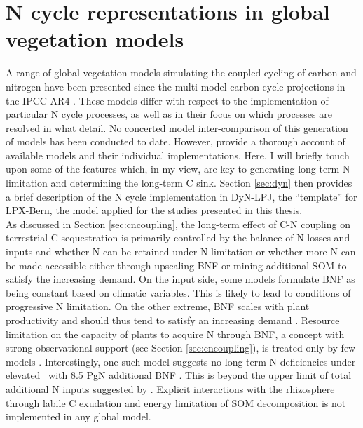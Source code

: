 \section{N cycle representations in global vegetation models}
\label{sec:nmodels}
A range of global vegetation models simulating the coupled cycling of carbon and nitrogen have been presented since the multi-model carbon cycle projections in the IPCC AR4 \citep{denman07ipcc}. These models differ with respect to the implementation of particular N cycle processes, as well as in their focus on which processes are resolved in what detail. No concerted model inter-comparison of this generation of models has been conducted to date. However, \citep{zaehledalmonech11} provide a thorough account of available models and their individual implementations. Here, I will briefly touch upon some of the features which, in my view, are key to generating long term N limitation and determining the long-term C sink. Section \ref{sec:dyn} then provides a brief description of the N cycle implementation in DyN-LPJ, the ``template'' for LPX-Bern, the model applied for the studies presented in this thesis.\\

As discussed in Section \ref{sec:cncoupling}, the long-term effect of C-N coupling on terrestrial C sequestration is primarily controlled by the balance of N losses and inputs and whether N can be retained under N limitation or whether more N can be made accessible either through upscaling BNF or mining additional SOM to satisfy the increasing demand. On the input side, some models \citep{zaehle10ocn1, jain09} formulate BNF as being constant based on climatic variables. This is likely to lead to conditions of progressive N limitation. On the other extreme, BNF scales with plant productivity and should thus tend to satisfy an increasing demand \citep{xuri08gcb, thornton07}. Resource limitation on the capacity of plants to acquire N through BNF, a concept with strong observational support (see Section \ref{sec:cncoupling}), is treated only by few models \citep{fisher10, esser11, gerber10}. Interestingly, one such model suggests no long-term N deficiencies under elevated \coo\ with 8.5 PgN additional BNF \citep{esser11}. This is beyond the upper limit of total additional N inputs suggested by \citep{hungate03}. Explicit interactions with the rhizosphere through labile C exudation and energy limitation of SOM decomposition is not implemented in any global model.\\

